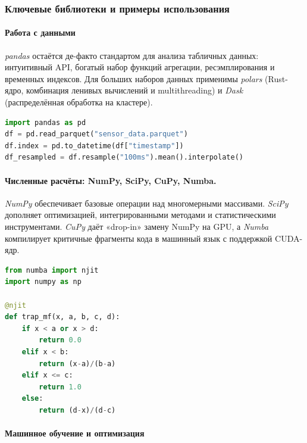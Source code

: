 \subsubsection{Ключевые библиотеки и примеры использования}

\paragraph{Работа с данными}

\emph{pandas} остаётся де-факто стандартом для анализа табличных данных:
интуитивный API, богатый набор функций агрегации, ресэмплирования
и временных индексов.  
Для больших наборов данных применимы \emph{polars} (Rust-ядро,
комбинация ленивых вычислений и multithreading) и \emph{Dask}
(распределённая обработка на кластере).

\begin{lstlisting}[language=Python, caption={Пример ресэмплирования временных рядов в pandas}, label={lst:pandas_resample}]
import pandas as pd
df = pd.read_parquet("sensor_data.parquet")
df.index = pd.to_datetime(df["timestamp"])
df_resampled = df.resample("100ms").mean().interpolate()
\end{lstlisting}

\newpage
\paragraph{Численные расчёты: NumPy, SciPy, CuPy, Numba.}

\emph{NumPy} обеспечивает базовые операции над многомерными массивами.
\emph{SciPy} дополняет оптимизацией, интегрированными методами и
статистическими инструментами.  
\emph{CuPy} даёт «drop-in» замену NumPy на GPU,
а \emph{Numba} компилирует критичные фрагменты кода в машинный язык
с поддержкой CUDA-ядр.

\begin{lstlisting}[language=Python, caption={Numba-ускоренная функция для трапециевидной MF}, label={lst:numba_trap}]
from numba import njit
import numpy as np

@njit
def trap_mf(x, a, b, c, d):
    if x < a or x > d:
        return 0.0
    elif x < b:
        return (x-a)/(b-a)
    elif x <= c:
        return 1.0
    else:
        return (d-x)/(d-c)
\end{lstlisting}

\paragraph{Машинное обучение и оптимизация}

